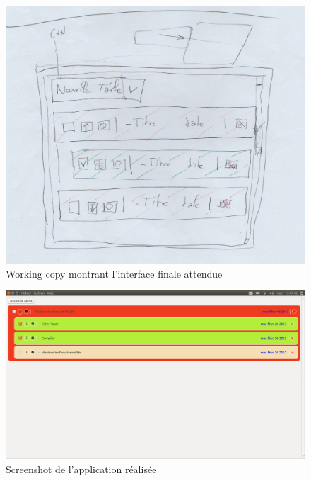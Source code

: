\documentclass[11pt]{article}
\begin{document}
\begin{figure}[H]
  \centering
  \includegraphics[width=12cm]{img/interfaceFinale.jpg}
  \caption{Working copy montrant l'interface finale attendue}
  \label{fig:interfacedefdessin}
\end{figure}

\begin{figure}[H]
  \centering
  \includegraphics[width=12cm]{img/screen.png}
  \caption{Screenshot de l'application réalisée}
  \label{fig:interfacedefscreen}
\end{figure}
\end{document}
